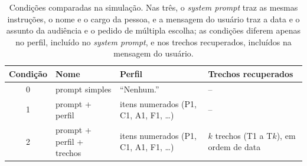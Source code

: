 \begin{table}[!htb]
  \centering
  \caption{Condições comparadas na simulação. Nas três, o \textit{system prompt} traz as mesmas
  instruções, o nome e o cargo da pessoa, e a mensagem do usuário traz a data e o assunto da
  audiência e o pedido de múltipla escolha; as condições diferem apenas no perfil, incluído no
  \textit{system prompt}, e nos trechos recuperados, incluídos na mensagem do usuário.}
  \label{tab:condicoes}
  \small
  \begin{tabularx}{\textwidth}{@{}cllX@{}}
    \toprule
    \textbf{Condição} & \textbf{Nome} & \textbf{Perfil} & \textbf{Trechos recuperados} \\
    \midrule
    0 & prompt simples            & ``Nenhum.''                                 & -- \\
    1 & prompt + perfil           & itens numerados (P1, C1, A1, F1, \ldots)    & -- \\
    2 & prompt + perfil + trechos & itens numerados (P1, C1, A1, F1, \ldots)    & $k$ trechos (T1 a T$k$), em ordem de data \\
    \bottomrule
  \end{tabularx}
\end{table}
